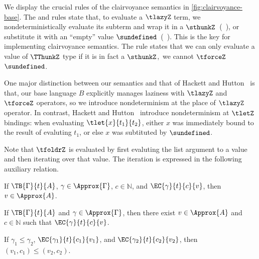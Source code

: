 We display the crucial rules of the clairvoyance semantics in
\cref{fig:clairvoyance-base}. The  and
 rules state that, to evaluate a \( \tlazyZ \) term,
we nondeterministically evaluate its subterm and wrap it in a
\( \sthunkZ \)~(\ie~), or substitute it with an
``empty'' value \( \sundefined \)~(\ie~). This is the
key for implementing clairvoyance semantics. The  rule states
that we can only evaluate a value of \( \TThunkZ \) type if it is in fact a
\( \sthunkZ \),\ie~we cannot \( \tforceZ \) \( \sundefined \).

One major distinction between our semantics and that of Hackett and
Hutton~\cite{clairvoyant} is that, our base language $B$ explicitly manages
laziness with \( \tlazyZ \) and \( \tforceZ \) operators, so we introduce
nondeterminism at the place of \( \tlazyZ \) operator. In contrast, Hackett and
Hutton~\cite{clairvoyant} introduce nondeterminism at \( \tletZ \) bindings:
when evaluating \( \tlet{x}{t_1}{t_2} \), either \( x \) was immediately bound
to the result of evaluting \( t_1 \), or else \( x \) was subtituted by
\( \sundefined \).

Note that \( \tfoldrZ \) is evaluated by first evaluting the list argument to a
value and then iterating over that value. The iteration is expressed in the
following auxiliary relation.

\begin{lemma}
  If \( \TB{\Gamma}{t}{A} \), \( \gamma \in \Approx{\Gamma} \),
  \( c \in \mathbb{N} \), and \( \EC{\gamma}{t}{c}{v} \), then
  \( v \in \Approx{A} \).
\end{lemma}

\begin{lemma}
  If \( \TB{\Gamma}{t}{A} \) and \( \gamma \in \Approx{\Gamma} \), then there
  exist \( v \in \Approx{A} \) and \( c \in \mathbb{N} \) such that
  \( \EC{\gamma}{t}{c}{v} \).
\end{lemma}

\begin{lemma}\label{prop:clair-mono}
  If \( \gamma_1 \le \gamma_2 \), \( \EC{\gamma_1}{t}{c_1}{v_1} \), and \( \EC{\gamma_2}{t}{c_2}{v_2} \), then \( (v_1, c_1) \le (v_2, c_2) \).
\end{lemma}


